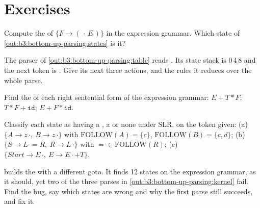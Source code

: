 \section{Exercises}\label{sec:b3:bottom-up-parsing:exercises}

\begin{exercise}[$\star$]\label{exo:b3:bottom-up-parsing:1}
Compute the  of $\{F \to (\,\cdot\,E\,)\}$ in the expression grammar. Which state of \cref{out:b3:bottom-up-parsing:states} is it?
\end{exercise}

\begin{exercise}[$\star$]\label{exo:b3:bottom-up-parsing:2}
The parser of \cref{out:b3:bottom-up-parsing:table} reads . Its state stack is 0\,4\,8 and the next token is \code{)}. Give its next three actions, and the rules it reduces over the whole parse.
\end{exercise}

\begin{exercise}[$\star$]\label{exo:b3:bottom-up-parsing:3}
Find the  of each right sentential form of the expression grammar: $E + T * F$; $T * F + \mathtt{id}$; $E + F * \mathtt{id}$.
\end{exercise}

\begin{exercise}[$\star$]\label{exo:b3:bottom-up-parsing:4}
Classify each state as having a , a  or none under SLR, on the token given: (a) $\{A \to z\,\cdot,\ B \to z\,\cdot\}$ with $\mathrm{FOLLOW}(A) = \{c\}$, $\mathrm{FOLLOW}(B) = \{c, d\}$; (b) $\{S \to L \cdot = R,\ R \to L\,\cdot\}$ with $= \in \mathrm{FOLLOW}(R)$; (c) $\{\mathit{Start} \to E\,\cdot,\ E \to E \cdot + T\}$.
\end{exercise}

\begin{exercise}[$\star\star$]\label{exo:b3:bottom-up-parsing:5}
 builds the  with a different goto. It finds 12 states on the expression grammar, as it should, yet two of the three parses in \cref{out:b3:bottom-up-parsing:kernel} fail. Find the bug, say which states are wrong and why the first parse still succeeds, and fix it.
\label{lst:b3:bottom-up-parsing:kernel}
\label{out:b3:bottom-up-parsing:kernel}
\end{exercise}

